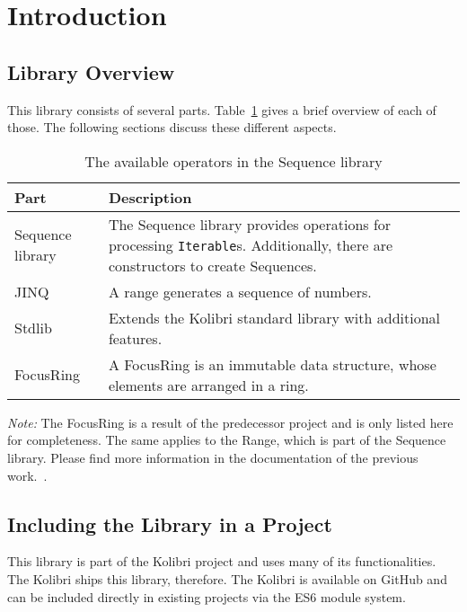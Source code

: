 \section{Introduction} %
\label{sec:Introduction}

\subsection{Library Overview} %
\label{sub:Sequence Library Overview}
This library consists of several parts. Table~\ref{tab:library_overview} gives a brief
overview of each of those. The following sections discuss these different
aspects.

\begin{table}[H]
  \centering
  \begin{tabularx}{\textwidth}{| l | X |} \hline
    \textbf{Part} & \textbf{Description} \\ \hline
    Sequence library & The Sequence library provides operations for processing \lstinline{Iterable}s. Additionally, there are constructors to create Sequences.\\ \hline 
    JINQ & A range generates a sequence of numbers. \\ \hline 
    Stdlib & Extends the Kolibri standard library with additional features.\\ \hline 
    FocusRing & A FocusRing is an immutable data structure, whose elements are arranged in a ring. \\ \hline 
  \end{tabularx}
  \caption{The available operators in the Sequence library}
  \label{tab:library_overview}
\end{table}

\textit{Note:} The FocusRing is a result of the predecessor project and is only
listed here for completeness. The same applies to the Range, which is part of
the Sequence library. Please find more information in the documentation of
the previous work.~\cite{wild_ip5_2023}. 

\subsection{Including the Library in a Project} %
This library is part of the Kolibri project and uses many of its
functionalities. The Kolibri ships this library, therefore. The Kolibri
is available on GitHub and can be included directly in existing projects via
the ES6 module system.
\label{sub:Including the Library in a Project}
